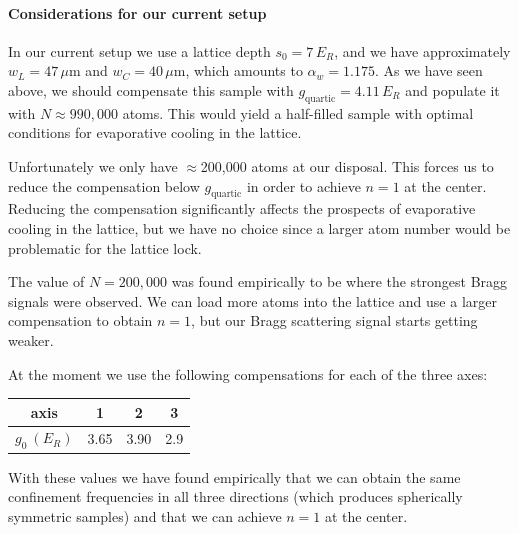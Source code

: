 \documentclass[11pt,letter]{article}
\newcommand{\awaist}{\ensuremath{ \alpha_{w} }}
\begin{document}
\paragraph{Considerations for our current setup}

In our current setup we use a lattice depth $s_{0}=7\,E_{R}$, and we have
approximately $w_{L}=47\,\mu$m and $w_{C}=40\,\mu$m,  which amounts to
$\awaist=1.175$.   As we have seen above, we should compensate this sample with
$g_{\text{quartic}} = 4.11\,E_{R}$ and populate it with $N\approx 990,000$
atoms.  This would yield a half-filled sample with optimal conditions for
evaporative cooling in the lattice.   

Unfortunately we only have $\approx$200,000 atoms at our disposal.   This
forces us to reduce the compensation below $g_{\text{quartic}}$  in order to
achieve $n=1$ at the center.   Reducing  the compensation significantly affects
the prospects of evaporative cooling in the lattice, but we have no choice
since a larger atom number would be problematic for the lattice lock.   

The value of $N=200,000$ was found empirically to be where the strongest Bragg
signals were observed.   We can load more atoms into the lattice and use a
larger compensation to obtain $n=1$, but our Bragg scattering signal starts
getting weaker.  
 
At the moment we use the following compensations for each of the three axes:
\begin{center}
\begin{tabular}{ c|c|c|c}
   axis & 1 & 2 & 3 \\
   \hline
   $g_{0}\ (E_{R})$ & 3.65 &  3.90 & 2.9 \\ 
\end{tabular}
\end{center}
With these values we have found empirically that we can obtain the same
confinement frequencies in all three directions (which produces spherically
symmetric samples) and that we can achieve $n=1$ at the center. 
\end{document}
